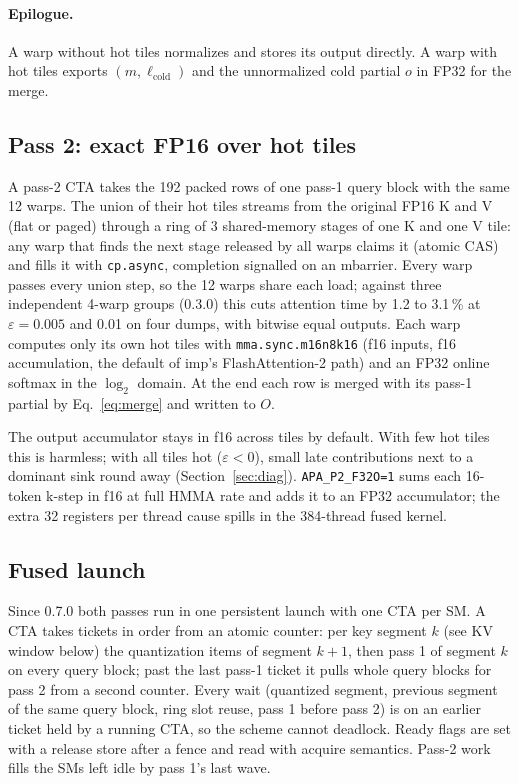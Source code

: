 \documentclass[10pt,twocolumn]{article}
\newcommand{\eps}{\varepsilon}
\newcommand{\code}[1]{\texttt{#1}}
\begin{document}
\paragraph{Epilogue.} A warp without hot tiles normalizes and stores its output directly. A warp with hot
tiles exports $(m,\ell_{\text{cold}})$ and the unnormalized cold partial $o$ in FP32 for the merge.

\subsection{Pass 2: exact FP16 over hot tiles}

A pass-2 CTA takes the 192 packed rows of one pass-1 query block with the same 12 warps. The union of their
hot tiles streams from the original FP16 K and V (flat or paged) through a ring of 3 shared-memory stages of
one K and one V tile: any warp that finds the next stage released by all warps claims it (atomic CAS) and
fills it with \code{cp.async}, completion signalled on an mbarrier. Every warp passes every union step, so
the 12 warps share each load; against three independent 4-warp groups (0.3.0) this cuts attention time by
1.2 to 3.1\,\% at $\eps=0.005$ and 0.01 on four dumps, with bitwise equal outputs. Each warp computes only its own hot tiles with
\code{mma.sync.m16n8k16} (f16 inputs, f16 accumulation, the default of imp's FlashAttention-2 path) and an
FP32 online softmax in the $\log_2$ domain. At the end each row is merged with its pass-1 partial by
Eq.~\eqref{eq:merge} and written to $O$.

The output accumulator stays in f16 across tiles by default. With few hot tiles this is harmless; with all
tiles hot ($\eps<0$), small late contributions next to a dominant sink round away
(Section~\ref{sec:diag}). \code{APA\_P2\_F32O=1} sums each 16-token k-step in f16 at full HMMA rate and adds
it to an FP32 accumulator; the extra 32 registers per thread cause spills in the 384-thread fused kernel.

\subsection{Fused launch}

Since 0.7.0 both passes run in one persistent launch with one CTA per SM. A CTA takes tickets in order from
an atomic counter: per key segment $k$ (see KV window below) the quantization items of segment $k+1$, then
pass 1 of segment $k$ on every query block; past the last pass-1 ticket it pulls whole query blocks for
pass 2 from a second counter. Every wait (quantized segment, previous segment of the same query block, ring
slot reuse, pass 1 before pass 2) is on an earlier ticket held by a running CTA, so the scheme cannot
deadlock. Ready flags are set with a release store after a fence and read with acquire semantics. Pass-2
work fills the SMs left idle by pass 1's last wave.
\end{document}
